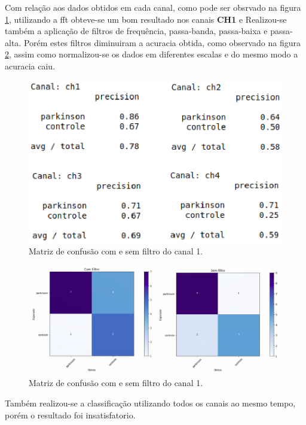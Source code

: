 Com relação aos dados obtidos em cada canal, como pode ser obsrvado na figura \ref{fcomparativo}, utilizando a fft obteve-se um bom resultado nos canais \textbf{CH1} e
Realizou-se também a aplicação de filtros de frequência, passa-banda, passa-baixa e passa-alta. Porém estes filtros diminuiram a acuracia obtida, como observado na figura \ref{comesemfiltro}, assim como normalizou-se os dados em diferentes escalas e do mesmo modo a acuracia caiu.

\begin{figure}[!htb]
	\centering
	\includegraphics[width=1.1\textwidth]{figuras/fcomparativo.eps}
	\caption{Matriz de confusão com e sem filtro do canal 1.}
	\label{fcomparativo}
\end{figure}

\begin{figure}[!htb]
	\centering
	\includegraphics[width=1.1\textwidth]{figuras/comesemfiltro.eps}
	\caption{Matriz de confusão com e sem filtro do canal 1.}
	\label{comesemfiltro}
\end{figure}

Também realizou-se a classificação utilizando todos os canais ao mesmo tempo, porém o resultado foi insatisfatorio.

